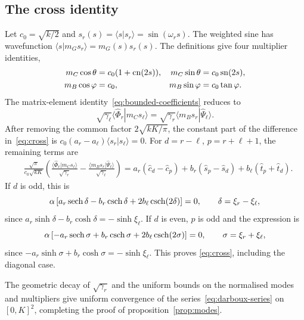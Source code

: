 \subsection{The cross identity}
Let $c_0=\sqrt{k/2}$ and $s_r(s)=\langle s|s_r\rangle=\sin(\omega_rs)$.
The weighted sine has wavefunction $\langle s|m_G s_r\rangle=m_G(s)s_r(s)$.
The definitions give four multiplier identities,
\begin{equation}
  \begin{aligned}
    m_C\cos\theta&=c_0(1+\operatorname{cn}(2s)),&
    m_C\sin\theta&=c_0\operatorname{sn}(2s),\\
    m_B\cos\varphi&=c_0,&m_B\sin\varphi&=c_0\tan\varphi.
  \end{aligned}
\end{equation}
The matrix-element identity~\eqref{eq:bounded-coefficients} reduces to
\begin{equation}
  \sqrt{\gamma_\ell}\langle\hat{\Phi}_r|m_C s_\ell\rangle
  =\sqrt{\gamma_r}\langle m_B s_r|\hat{\Psi}_\ell\rangle.
  \label{eq:cross}
\end{equation}
After removing the common factor $2\sqrt{kK/\pi}$, the constant part of
the difference in~\eqref{eq:cross} is
$c_0(a_r-a_\ell)\langle s_r|s_\ell\rangle=0$.
For $d=r-\ell$, $p=r+\ell+1$, the remaining terms are
\begin{equation}
  \begin{aligned}
    &\frac{\sqrt{\pi}}{c_0\sqrt{kK}}
    \left(\frac{\langle\hat{\Phi}_r|m_C s_\ell\rangle}{\sqrt{\gamma_r}}
    -\frac{\langle m_B s_r|\hat{\Psi}_\ell\rangle}{\sqrt{\gamma_\ell}}\right)
    =a_r(\widehat c_d-\widehat c_p)
    +b_r(\widehat s_p-\widehat s_d)
    +b_\ell(\widehat t_p+\widehat t_d).
  \end{aligned}
\end{equation}
If $d$ is odd, this is
\begin{equation}
  \alpha\left[a_r\operatorname{sech}\delta-b_r\operatorname{csch}\delta
    +2b_\ell\operatorname{csch}(2\delta)\right]=0,
  \qquad\delta=\xi_r-\xi_\ell,
\end{equation}
since $a_r\sinh\delta-b_r\cosh\delta=-\sinh\xi_\ell$.
If $d$ is even, $p$ is odd and the expression is
\begin{equation}
  \alpha\left[-a_r\operatorname{sech}\sigma+b_r\operatorname{csch}\sigma
    +2b_\ell\operatorname{csch}(2\sigma)\right]=0,
  \qquad\sigma=\xi_r+\xi_\ell,
\end{equation}
since $-a_r\sinh\sigma+b_r\cosh\sigma=-\sinh\xi_\ell$.
This proves \eqref{eq:cross}, including the diagonal case.

The geometric decay of $\sqrt{\gamma_r}$ and the uniform bounds on the
normalised modes and multipliers give uniform convergence of the
series~\eqref{eq:darboux-series} on $[0,K]^2$, completing the proof of
proposition~\ref{prop:modes}.
